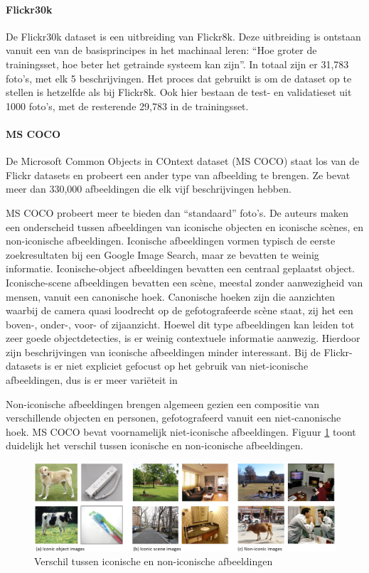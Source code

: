 \paragraph{Flickr30k}
\label{par:Flickr30k}
De Flickr30k dataset\cite{Young2014} is een uitbreiding van Flickr8k. Deze uitbreiding is ontstaan vanuit een van de basisprincipes in het machinaal leren: ``Hoe groter de trainingsset, hoe beter het getrainde systeem kan zijn''. In totaal zijn er 31,783 foto's, met elk 5 beschrijvingen. Het proces dat gebruikt is om de dataset op te stellen is hetzelfde als bij Flickr8k. Ook hier bestaan de test- en validatieset uit 1000 foto's, met de resterende 29,783 in de trainingsset.


\paragraph{MS COCO}
\label{par:MS COCO}
De Microsoft Common Objects in COntext dataset (MS COCO)\cite{Lin2014} staat los van de Flickr datasets en probeert een ander type van afbeelding te brengen. Ze bevat meer dan 330,000 afbeeldingen die elk vijf beschrijvingen hebben. 

MS COCO probeert meer te bieden dan ``standaard'' foto's. De auteurs maken een onderscheid tussen afbeeldingen van iconische objecten en iconische sc\`enes, en non-iconische afbeeldingen. Iconische afbeeldingen vormen typisch de eerste zoekresultaten bij een Google Image Search, maar ze bevatten te weinig informatie. Iconische-object afbeeldingen bevatten een centraal geplaatst object. Iconische-scene afbeeldingen bevatten een sc\`ene, meestal zonder aanwezigheid van mensen, vanuit een canonische hoek. Canonische hoeken zijn die aanzichten waarbij de camera quasi loodrecht op de gefotografeerde sc\`ene staat, zij het een boven-, onder-, voor- of zijaanzicht. Hoewel dit type afbeeldingen kan leiden tot zeer goede objectdetecties, is er weinig contextuele informatie aanwezig. Hierdoor zijn beschrijvingen van iconische afbeeldingen minder interessant. Bij de Flickr-datasets is er niet expliciet gefocust op het gebruik van niet-iconische afbeeldingen, dus is er meer vari\"eteit in 

Non-iconische afbeeldingen brengen algemeen gezien een compositie van verschillende objecten en personen, gefotografeerd vanuit een niet-canonische hoek. MS COCO bevat voornamelijk niet-iconische afbeeldingen. Figuur \ref{fig:cocotypes} toont duidelijk het verschil tussen iconische en non-iconische afbeeldingen.

\begin{figure}[tb]
    \centering
    \includegraphics[width=\linewidth]{Images/iconic.jpg}
    \caption{Verschil tussen iconische en non-iconische afbeeldingen}
    \label{fig:cocotypes}
\end{figure}


